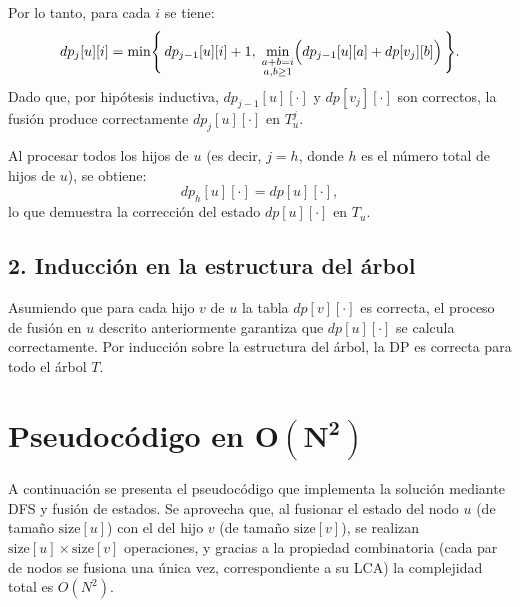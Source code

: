 Por lo tanto, para cada \(i\) se tiene:
\[
dp_j[u][i] = \min \Biggl\{\, dp_{j-1}[u][i] + 1,\; \min_{\substack{a+b=i \\ a,b\ge1}} \Bigl( dp_{j-1}[u][a] + dp[v_j][b] \Bigr) \,\Biggr\}.
\]
Dado que, por hipótesis inductiva, \(dp_{j-1}[u][\cdot]\) y \(dp[v_j][\cdot]\) son correctos, la fusión produce correctamente \(dp_j[u][\cdot]\) en \(T_u^j\).

Al procesar todos los hijos de \(u\) (es decir, \(j=h\), donde \(h\) es el número total de hijos de \(u\)), se obtiene:
\[
dp_h[u][\cdot] = dp[u][\cdot],
\]
lo que demuestra la corrección del estado \(dp[u][\cdot]\) en \(T_u\).

\subsection*{2. Inducción en la estructura del árbol}

Asumiendo que para cada hijo \(v\) de \(u\) la tabla \(dp[v][\cdot]\) es correcta, el proceso de fusión en \(u\) descrito anteriormente garantiza que \(dp[u][\cdot]\) se calcula correctamente. Por inducción sobre la estructura del árbol, la DP es correcta para todo el árbol \(T\).

\bigskip

\section{Pseudocódigo en \(\boldsymbol{O(N^2)}\)}

A continuación se presenta el pseudocódigo que implementa la solución mediante DFS y fusión de estados. Se aprovecha que, al fusionar el estado del nodo \(u\) (de tamaño \(\text{size}[u]\)) con el del hijo \(v\) (de tamaño \(\text{size}[v]\)), se realizan \(\text{size}[u] \times \text{size}[v]\) operaciones, y gracias a la propiedad combinatoria (cada par de nodos se fusiona una única vez, correspondiente a su LCA) la complejidad total es \(O(N^2)\).

